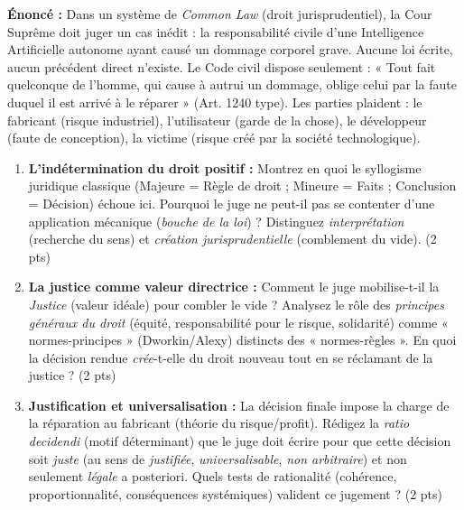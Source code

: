 \documentclass[11pt]{article}
\begin{document}
\begin{exercice}
\textbf{Énoncé :} Dans un système de \textit{Common Law} (droit jurisprudentiel), la Cour Suprême doit juger un cas inédit : la responsabilité civile d'une Intelligence Artificielle autonome ayant causé un dommage corporel grave. Aucune loi écrite, aucun précédent direct n'existe. Le Code civil dispose seulement : « Tout fait quelconque de l'homme, qui cause à autrui un dommage, oblige celui par la faute duquel il est arrivé à le réparer » (Art. 1240 type). Les parties plaident : le fabricant (risque industriel), l'utilisateur (garde de la chose), le développeur (faute de conception), la victime (risque créé par la société technologique).

\begin{enumerate}
    \item \textbf{L'indétermination du droit positif :} Montrez en quoi le syllogisme juridique classique (Majeure = Règle de droit ; Mineure = Faits ; Conclusion = Décision) échoue ici. Pourquoi le juge ne peut-il pas se contenter d'une application mécanique (\textit{bouche de la loi}) ? Distinguez \textit{interprétation} (recherche du sens) et \textit{création jurisprudentielle} (comblement du vide). (2 pts)
    \item \textbf{La justice comme valeur directrice :} Comment le juge mobilise-t-il la \textit{Justice} (valeur idéale) pour combler le vide ? Analysez le rôle des \textit{principes généraux du droit} (équité, responsabilité pour le risque, solidarité) comme « normes-principes » (Dworkin/Alexy) distincts des « normes-règles ». En quoi la décision rendue \textit{crée}-t-elle du droit nouveau tout en se réclamant de la justice ? (2 pts)
    \item \textbf{Justification et universalisation :} La décision finale impose la charge de la réparation au fabricant (théorie du risque/profit). Rédigez la \textit{ratio decidendi} (motif déterminant) que le juge doit écrire pour que cette décision soit \textit{juste} (au sens de \textit{justifiée}, \textit{universalisable}, \textit{non arbitraire}) et non seulement \textit{légale} a posteriori. Quels tests de rationalité (cohérence, proportionnalité, conséquences systémiques) valident ce jugement ? (2 pts)
\end{enumerate}
\end{exercice}
\end{document}

